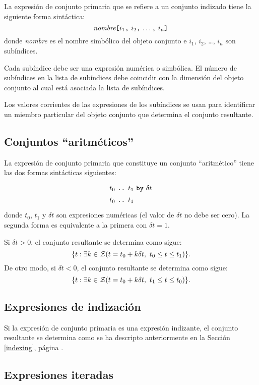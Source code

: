 \documentclass[11pt,spanish]{report}
\begin{document}
La expresión de conjunto primaria que se refiere a un conjunto indizado tiene la siguiente forma sintáctica:
$$\mbox{{\it nombre}{\tt[}$i_1${\tt,} $i_2${\tt,} \dots{\tt,}
$i_n${\tt]}}$$
donde {\it nombre} es el nombre simbólico del objeto conjunto e $i_1$, $i_2$,
\dots, $i_n$ son subíndices.

Cada subíndice debe ser una expresión numérica o simbólica. El número de subíndices en la lista de subíndices debe coincidir con la dimensión del objeto conjunto al cual está asociada la lista de subíndices.

Los valores corrientes de las expresiones de los subíndices se usan para identificar un miembro particular del objeto conjunto que determina el conjunto resultante.

\subsection{Conjuntos ``aritméticos''}

La expresión de conjunto primaria que constituye un conjunto ``aritmético'' tiene las dos formas sintácticas siguientes:
$$
{\def\arraystretch{1.4}
\begin{array}{l}
\mbox{$t_0$ {\tt..} $t_1$ {\tt by} $\delta t$}\\
\mbox{$t_0$ {\tt..} $t_1$}\\
\end{array}
}
$$
donde $t_0$, $t_1$ y $\delta t$ son expresiones numéricas (el valor de
$\delta t$ no debe ser cero). La segunda forma es equivalente a la primera con $\delta t=1$.

Si $\delta t>0$, el conjunto resultante se determina como sigue:
$$\{t:\exists k\in{\cal Z}(t=t_0+k\delta t,\ t_0\leq t\leq t_1)\}.$$
De otro modo, si $\delta t<0$, el conjunto resultante se determina como sigue:
$$\{t:\exists k\in{\cal Z}(t=t_0+k\delta t,\ t_1\leq t\leq t_0)\}.$$

\subsection{Expresiones de indización}

Si la expresión de conjunto primaria es una expresión indizante, el conjunto resultante se determina como se ha descripto anteriormente en la Sección \ref{indexing}, página \pageref{indexing}.

\subsection{Expresiones iteradas}
\end{document}
